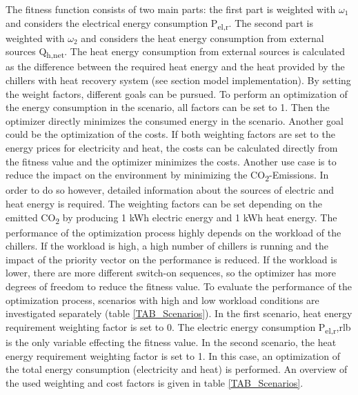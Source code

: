 \documentclass[3p,times,procedia,twocolumn,twoside]{elsarticle}
\begin{document}
The fitness function consists of two main parts: the first part is weighted with $ \omega_{1} $ and considers the electrical energy consumption P\textsubscript{el,r}. The second part is weighted with $ \omega_{2} $ and considers the heat energy consumption from external sources Q\textsubscript{h,net}. The heat energy consumption from external sources is calculated as the difference between the required heat energy and the heat provided by the chillers with heat recovery system (see section model implementation).
By setting the weight factors, different goals can be pursued. To perform an optimization of the energy consumption in the scenario, all factors can be set to 1. Then the optimizer directly minimizes the consumed energy in the scenario. Another goal could be the optimization of the costs. If both weighting factors are set to the energy prices for electricity and heat, the costs can be calculated directly from the fitness value and the optimizer minimizes the costs. Another use case is to reduce the impact on the environment by minimizing the CO\textsubscript{2}-Emissions. In order to do so however, detailed information about the sources of electric and heat energy is required. The weighting factors can be set depending on the emitted CO\textsubscript{2} by producing 1 kWh electric energy and 1 kWh heat energy.
The performance of the optimization process highly depends on the workload of the chillers. If the workload is high, a high number of chillers is running and the impact of the priority vector on the performance is reduced. If the workload is lower, there are more different switch-on sequences, so the optimizer has more degrees of freedom to reduce the fitness value. To evaluate the performance of the optimization process, scenarios with high and low workload conditions are investigated separately (table \ref{TAB_Scenarios}).
In the first scenario, heat energy requirement weighting factor is set to 0. The electric energy consumption P\textsubscript{el,r},rlb is the only variable effecting the fitness value. In the second scenario, the heat energy requirement weighting factor is set to 1. In this case, an optimization of the total energy consumption (electricity and heat) is performed. An overview of the used weighting and cost factors is given in table \ref{TAB_Scenarios}.
\end{document}
